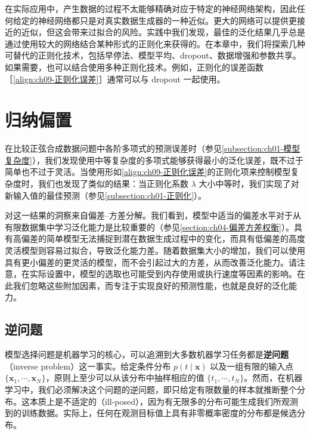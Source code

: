 \documentclass[../../main.tex]{subfiles}
\begin{document}
在实际应用中，产生数据的过程不太能够精确对应于特定的神经网络架构，因此任何给定的神经网络都只是对真实数据生成器的一种近似。更大的网络可以提供更接近的近似，但这会带来过拟合的风险。实践中我们发现，最佳的泛化结果几乎总是通过使用较大的网络结合某种形式的正则化来获得的。在本章中，我们将探索几种可替代的正则化技术，包括早停法、模型平均、dropout、数据增强和参数共享。如果需要，也可以结合使用多种正则化技术。例如，正则化的误差函数［\eqref{align:ch09-正则化误差}］通常可以与 dropout 一起使用。

\section{归纳偏置}\label{section:ch09-归纳偏置}

在比较正弦合成数据问题中各阶多项式的预测误差时（参见\cref{subsection:ch01-模型复杂度}），我们发现使用中等复杂度的多项式能够获得最小的泛化误差，既不过于简单也不过于灵活。当使用形如\eqref{align:ch09-正则化误差}的正则化项来控制模型复杂度时，我们也发现了类似的结果：当正则化系数 $\lambda$ 大小中等时，我们实现了对新输入值的最佳预测（参见\cref{subsection:ch01-正则化}）。

对这一结果的洞察来自偏差--方差分解。我们看到，模型中适当的偏差水平对于从有限数据集中学习泛化能力是比较重要的（参见\cref{section:ch04-偏差方差权衡}）。具有高偏差的简单模型无法捕捉到潜在数据生成过程中的变化，而具有低偏差的高度灵活模型则容易过拟合，导致泛化能力差。随着数据集大小的增加，我们可以使用具有更小偏差的更灵活的模型，而不会引起过大的方差，从而改善泛化能力。请注意，在实际设置中，模型的选取也可能受到内存使用或执行速度等因素的影响。在此我们忽略这些附加因素，而专注于实现良好的预测性能，也就是良好的泛化能力。

\subsection{逆问题}\label{subsection:ch09-逆问题}

模型选择问题是机器学习的核心，可以追溯到大多数机器学习任务都是\textbf{逆问题}（inverse problem）这一事实。给定条件分布 $p(t\mid\boldsymbol{x})$ 以及一组有限的输入点 $\{\boldsymbol{x}_{1},\cdots,\boldsymbol{x}_{N}\}$，原则上至少可以从该分布中抽样相应的值 $\{t_{1},\cdots,t_{N}\}$。然而，在机器学习中，我们必须解决这个问题的逆问题，即只给定有限数量的样本就推断整个分布。这本质上是不适定的（ill-posed），因为有无限多的分布可能生成我们所观测到的训练数据。实际上，任何在观测目标值上具有非零概率密度的分布都是候选分布。
\end{document}
